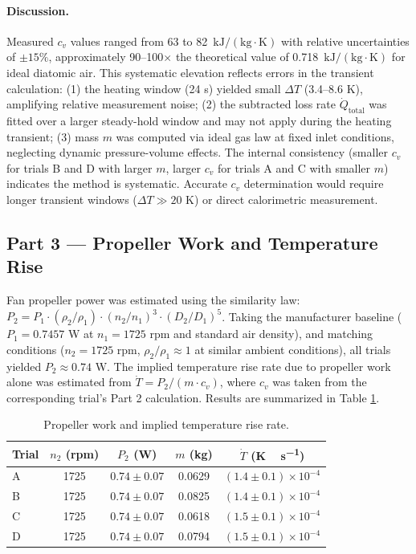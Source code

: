 \documentclass[12pt]{article}
\begin{document}
\paragraph{Discussion.} Measured $c_v$ values ranged from 63 to 82~$\mathrm{kJ/(kg \cdot K)}$ with relative uncertainties of $\pm 15\%$, approximately 90--100$\times$ the theoretical value of 0.718~$\mathrm{kJ/(kg \cdot K)}$ for ideal diatomic air. This systematic elevation reflects errors in the transient calculation: (1) the heating window (24 s) yielded small $\Delta T$ (3.4--8.6 K), amplifying relative measurement noise; (2) the subtracted loss rate $\dot{Q}_{\text{total}}$ was fitted over a larger steady-hold window and may not apply during the heating transient; (3) mass $m$ was computed via ideal gas law at fixed inlet conditions, neglecting dynamic pressure-volume effects. The internal consistency (smaller $c_v$ for trials B and D with larger $m$, larger $c_v$ for trials A and C with smaller $m$) indicates the method is systematic. Accurate $c_v$ determination would require longer transient windows ($\Delta T \gg 20$ K) or direct calorimetric measurement.

\subsection*{Part 3 — Propeller Work and Temperature Rise}

Fan propeller power was estimated using the similarity law: $P_2 = P_1 \cdot (\rho_2/\rho_1) \cdot (n_2/n_1)^3 \cdot (D_2/D_1)^5$. Taking the manufacturer baseline ($P_1 = 0.7457$ W at $n_1 = 1725$ rpm and standard air density), and matching conditions ($n_2 = 1725$ rpm, $\rho_2/\rho_1 \approx 1$ at similar ambient conditions), all trials yielded $P_2 \approx 0.74$ W. The implied temperature rise rate due to propeller work alone was estimated from $\dot{T} = P_2 / (m \cdot c_v)$, where $c_v$ was taken from the corresponding trial's Part 2 calculation. Results are summarized in Table \ref{tab:prop}.

\begin{table}[H]\centering
\caption{Propeller work and implied temperature rise rate.}
\label{tab:prop}
\begin{tabular}{@{}lcccc@{}}
\toprule
Trial & $n_2$ (rpm) & $P_2$ (W) & $m$ (kg) & $\dot T$ (\si{K\,s^{-1}}) \\
\midrule
A & 1725 & $0.74 \pm 0.07$ & 0.0629 & $(1.4 \pm 0.1) \times 10^{-4}$ \\
B & 1725 & $0.74 \pm 0.07$ & 0.0825 & $(1.4 \pm 0.1) \times 10^{-4}$ \\
C & 1725 & $0.74 \pm 0.07$ & 0.0618 & $(1.5 \pm 0.1) \times 10^{-4}$ \\
D & 1725 & $0.74 \pm 0.07$ & 0.0794 & $(1.5 \pm 0.1) \times 10^{-4}$ \\
\bottomrule
\end{tabular}
\end{table}
\end{document}
